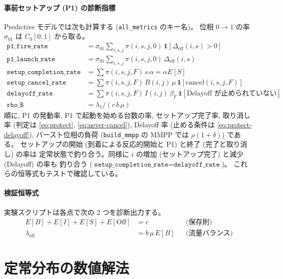 \documentclass[a4paper,11pt]{article}
\newcommand{\code}[1]{\texttt{#1}}
\newcommand{\eff}{\mathrm{eff}}
\begin{document}
\paragraph{事前セットアップ (P1) の診断指標}
Predictive モデルでは次も計算する (\code{all\_metrics} のキー名)。
位相 $0\to1$ の率 $\sigma_{01}$ は $C_0[0,1]$ から取る。
\begin{align}
  \code{p1\_fire\_rate} &= \sigma_{01}\sum_{i,s,j}\pi(i,s,j,0)\,\mathbf{1}[\Delta_\eff(i,s)>0]\\
  \code{p1\_launch\_rate} &= \sigma_{01}\sum_{i,s,j}\pi(i,s,j,0)\,\Delta_\eff(i,s)\\
  \code{setup\_completion\_rate} &= \sum \pi(i,s,j,F)\,s\,\alpha = \alpha E[S]\\
  \code{setup\_cancel\_rate} &= \sum \pi(i,s,j,F)\,B(i,j)\,\mu\,
     \mathbf{1}[\mathrm{cancel}(i,s,j,F)]\\
  \code{delayoff\_rate} &= \sum \pi(i,s,j,F)\,I(i,j)\,\beta_F\,
     \mathbf{1}[\text{Delayoff が止められていない}]\\
  \code{rho\_B} &= \lambda_1/(c\,b\,\mu)
\end{align}
順に, P1 の発動率, P1 で起動を始める台数の率, セットアップ完了率,
取り消し率 (判定は \eqref{eq:protect}, \eqref{eq:never-cancel}),
Delayoff 率 (止める条件は \eqref{eq:protect-delayoff}),
バースト位相の負荷 (\code{build\_mmpp} の MMPP では $\rho(1+\delta)$) である。
セットアップの開始 (到着による反応的開始と P1) と終了 (完了と取り消し) の率は
定常状態で釣り合う。同様に $i$ の増加 (セットアップ完了) と減少 (Delayoff) の率も
釣り合う ($\code{setup\_completion\_rate}=\code{delayoff\_rate}$)。
これらの恒等式もテストで確認している。

\paragraph{検証恒等式}
実験スクリプトは各点で次の 2 つを診断出力する。
\begin{align}
  E[B]+E[I]+E[S]+E[\mathrm{Off}] &= c &&\text{(保存則)}\\
  \lambda_\eff &= b\,\mu\,E[B] &&\text{(流量バランス)}
\end{align}

\section{定常分布の数値解法}
\label{sec:solver}
\end{document}
